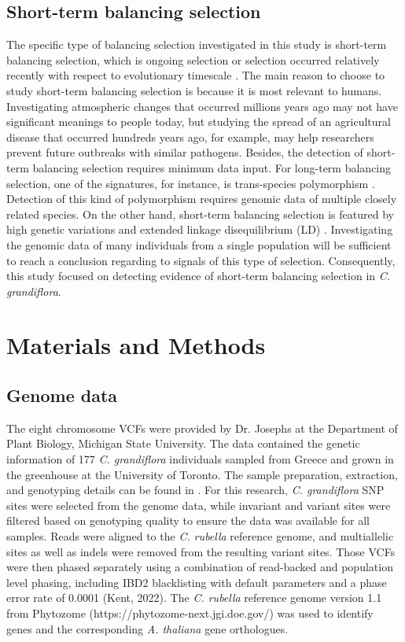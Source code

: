 \subsection{Short-term balancing selection}
The specific type of balancing selection investigated in this study is short-term balancing selection, which is ongoing selection or selection occurred relatively recently with respect to evolutionary timescale \citep{RN2}. The main reason to choose to study short-term balancing selection is because it is most relevant to humans. Investigating atmospheric changes that occurred millions years ago may not have significant meanings to people today, but studying the spread of an agricultural disease that occurred hundreds years ago, for example, may help researchers prevent future outbreaks with similar pathogens. Besides, the detection of short-term balancing selection requires minimum data input. For long-term balancing selection, one of the signatures, for instance, is trans-species polymorphism \citep{RN2}. Detection of this kind of polymorphism requires genomic data of multiple closely related species. On the other hand, short-term balancing selection is featured by high genetic variations and extended linkage disequilibrium (LD) \citep{RN2}. Investigating the genomic data of many individuals from a single population will be sufficient to reach a conclusion regarding to signals of this type of selection. Consequently, this study focused on detecting evidence of short-term balancing selection in \emph{C. grandiflora}.

\section{Materials and Methods}
\subsection{Genome data}
The eight chromosome VCFs were provided by Dr. Josephs at the Department of Plant Biology, Michigan State University. The data contained the genetic information of 177 \emph{C. grandiflora} individuals sampled from Greece and grown in the greenhouse at the University of Toronto. The sample preparation, extraction, and genotyping details can be found in \citet{RN11}. For this research, \emph{C. grandiflora} SNP sites were selected from the genome data, while invariant and variant sites were filtered based on genotyping quality to ensure the data was available for all samples. Reads were aligned to the \emph{C. rubella} reference genome, and multiallelic sites as well as indels were removed from the resulting variant sites. Those VCFs were then phased separately using a combination of read-backed and population level phasing, including IBD2 blacklisting with default parameters and a phase error rate of 0.0001 (Kent, 2022). The \emph{C. rubella} reference genome version 1.1 from Phytozome (https://phytozome-next.jgi.doe.gov/)  was used to identify genes and the corresponding \emph{A. thaliana} gene orthologues.

